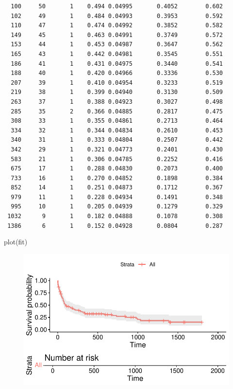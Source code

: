 \documentclass[
  12pt,
  letterpaper,
  DIV=11,
  numbers=noendperiod,
  onepage,
  openany]{scrreprt}
\newenvironment{Shaded}{\begin{snugshade}}{\end{snugshade}}
\newcommand{\FunctionTok}[1]{\textcolor[rgb]{0.94,0.94,0.56}{#1}}
\newcommand{\NormalTok}[1]{\textcolor[rgb]{0.80,0.80,0.80}{#1}}
\begin{document}
\begin{verbatim}
  100     50       1    0.494 0.04995       0.4052        0.602
  102     49       1    0.484 0.04993       0.3953        0.592
  110     47       1    0.474 0.04992       0.3852        0.582
  149     45       1    0.463 0.04991       0.3749        0.572
  153     44       1    0.453 0.04987       0.3647        0.562
  165     43       1    0.442 0.04981       0.3545        0.551
  186     41       1    0.431 0.04975       0.3440        0.541
  188     40       1    0.420 0.04966       0.3336        0.530
  207     39       1    0.410 0.04954       0.3233        0.519
  219     38       1    0.399 0.04940       0.3130        0.509
  263     37       1    0.388 0.04923       0.3027        0.498
  285     35       2    0.366 0.04885       0.2817        0.475
  308     33       1    0.355 0.04861       0.2713        0.464
  334     32       1    0.344 0.04834       0.2610        0.453
  340     31       1    0.333 0.04804       0.2507        0.442
  342     29       1    0.321 0.04773       0.2401        0.430
  583     21       1    0.306 0.04785       0.2252        0.416
  675     17       1    0.288 0.04830       0.2073        0.400
  733     16       1    0.270 0.04852       0.1898        0.384
  852     14       1    0.251 0.04873       0.1712        0.367
  979     11       1    0.228 0.04934       0.1491        0.348
  995     10       1    0.205 0.04939       0.1279        0.329
 1032      9       1    0.182 0.04888       0.1078        0.308
 1386      6       1    0.152 0.04928       0.0804        0.287
\end{verbatim}

\begin{Shaded}
\begin{Highlighting}[]
\FunctionTok{plot}\NormalTok{(fit)}
\end{Highlighting}
\end{Shaded}

\begin{figure}[H]

{\centering \includegraphics{14-R_files/figure-pdf/unnamed-chunk-8-1.pdf}

}

\end{figure}
\end{document}
